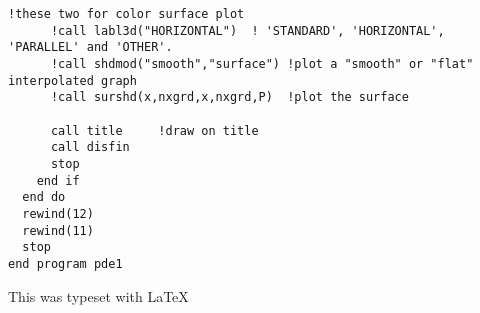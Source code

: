 \documentclass[titlepage,11pt]{article}
\begin{document}
\begin{singlespacing}
\begin{small}
\begin{Verbatim}[frame=single]
      !these two for color surface plot
      !call labl3d("HORIZONTAL")  ! 'STANDARD', 'HORIZONTAL', 'PARALLEL' and 'OTHER'.
      !call shdmod("smooth","surface") !plot a "smooth" or "flat" interpolated graph
      !call surshd(x,nxgrd,x,nxgrd,P)  !plot the surface

      call title     !draw on title
      call disfin
      stop
    end if
  end do
  rewind(12)
  rewind(11)
  stop
end program pde1
\end{Verbatim}
\end{small}
\end{singlespacing}
\noindent This was typeset with \LaTeX
\end{document}
